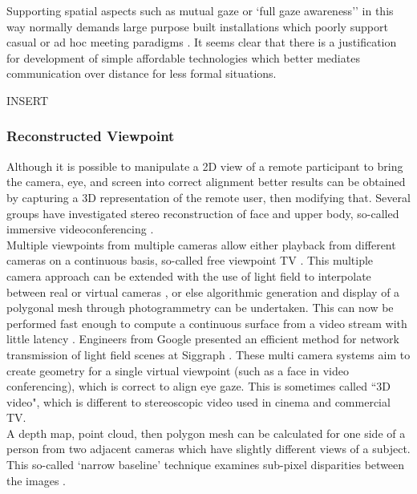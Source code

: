             Supporting spatial aspects such as mutual gaze or `full gaze awareness'' \cite{Monk2002} in this way normally demands large purpose built installations which poorly support casual or ad hoc meeting paradigms \cite{Schroeder2001, Wolff2008}. It seems clear that there is a justification for development of simple affordable technologies which better mediates communication over distance for less formal situations.   

INSERT

   
\subsubsection{Reconstructed Viewpoint}
Although it is possible to manipulate a 2D view of a remote participant to bring the camera, eye, and screen into correct alignment better results can be obtained by capturing a 3D representation of the remote user, then modifying that. Several groups have investigated stereo reconstruction of face and upper body, so-called immersive videoconferencing \cite{Atzpadin2004}. \\                   Multiple viewpoints from multiple cameras allow either playback from different cameras on a continuous basis, so-called free viewpoint TV \cite{Zhang2007}. This multiple camera approach can be extended with the use of light field to interpolate between real or virtual cameras \cite{Ott1993, Al-Saidi2009}, or else algorithmic generation and display of a polygonal mesh through photogrammetry can be undertaken. This can now be performed fast enough to compute a continuous surface from a video stream with little latency \cite{Criminisi:2003ji}. 
Engineers from Google presented an efficient method for network transmission of light field scenes at Siggraph \cite{broxton2020immersive}.
These multi camera systems aim to create geometry for a single virtual viewpoint (such as a face in video conferencing), which is correct to align eye gaze. This is sometimes called ``3D video", which is different to stereoscopic video used in cinema and commercial TV.\\
 A depth map, point cloud, then polygon mesh can be calculated for one side of a person from two adjacent cameras which have slightly different views of a subject.  This so-called `narrow baseline' technique examines sub-pixel disparities between the images \cite{Knoblauch2008}. \\

